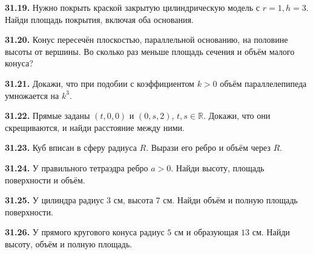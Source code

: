 \noindent\begin{minipage}[t]{\linewidth}\textbf{31.19.} Нужно покрыть краской закрытую цилиндрическую модель с \(r=1,h=3\). Найди площадь покрытия, включая оба основания.\par\end{minipage}\par
\noindent\begin{minipage}[t]{\linewidth}\textbf{31.20.} Конус пересечён плоскостью, параллельной основанию, на половине высоты от вершины. Во сколько раз меньше площадь сечения и объём малого конуса?\par\end{minipage}\par
\noindent\begin{minipage}[t]{\linewidth}\textbf{31.21.}\starmark{} Докажи, что при подобии с коэффициентом \(k>0\) объём параллелепипеда умножается на \(k^3\).\par\end{minipage}\par
\noindent\begin{minipage}[t]{\linewidth}\textbf{31.22.}\starmark{} Прямые заданы \((t,0,0)\) и \((0,s,2)\), \(t,s\in\mathbb R\). Докажи, что они скрещиваются, и найди расстояние между ними.\par\end{minipage}\par
\noindent\begin{minipage}[t]{\linewidth}\textbf{31.23.}\starmark{} Куб вписан в сферу радиуса \(R\). Вырази его ребро и объём через \(R\).\par\end{minipage}\par
\noindent\begin{minipage}[t]{\linewidth}\textbf{31.24.}\starmark{} У правильного тетраэдра ребро \(a>0\). Найди высоту, площадь поверхности и объём.\par\end{minipage}\par
\noindent\begin{minipage}[t]{\linewidth}\textbf{31.25.} У цилиндра радиус \(3\) см, высота \(7\) см. Найди объём и полную площадь поверхности.\par\end{minipage}\par
\noindent\begin{minipage}[t]{\linewidth}\textbf{31.26.} У прямого кругового конуса радиус \(5\) см и образующая \(13\) см. Найди высоту, объём и полную площадь.\par\end{minipage}\par
